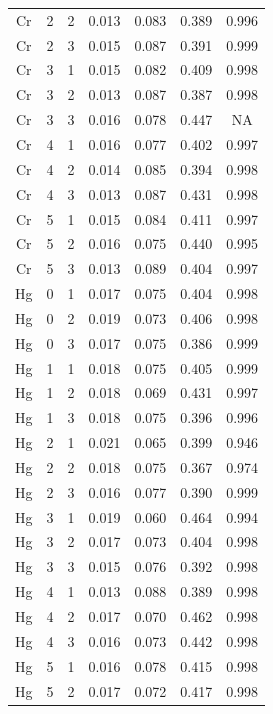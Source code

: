 \documentclass[ms, hidelinks]{uncgdissertationexp}
\theoremstyle{plain}
\theoremstyle{definition}
\theoremstyle{remark}
\begin{document}
\begin{longtable}{ccccccc}
Cr & 2 & 2 & 0.013 & 0.083 & 0.389 & 0.996\\
\rowcolor{gray!6}  Cr & 2 & 3 & 0.015 & 0.087 & 0.391 & 0.999\\
Cr & 3 & 1 & 0.015 & 0.082 & 0.409 & 0.998\\
\rowcolor{gray!6}  Cr & 3 & 2 & 0.013 & 0.087 & 0.387 & 0.998\\
Cr & 3 & 3 & 0.016 & 0.078 & 0.447 & NA\\
\rowcolor{gray!6}  Cr & 4 & 1 & 0.016 & 0.077 & 0.402 & 0.997\\
Cr & 4 & 2 & 0.014 & 0.085 & 0.394 & 0.998\\
\rowcolor{gray!6}  Cr & 4 & 3 & 0.013 & 0.087 & 0.431 & 0.998\\
Cr & 5 & 1 & 0.015 & 0.084 & 0.411 & 0.997\\
\rowcolor{gray!6}  Cr & 5 & 2 & 0.016 & 0.075 & 0.440 & 0.995\\
Cr & 5 & 3 & 0.013 & 0.089 & 0.404 & 0.997\\
\rowcolor{gray!6}  Hg & 0 & 1 & 0.017 & 0.075 & 0.404 & 0.998\\
Hg & 0 & 2 & 0.019 & 0.073 & 0.406 & 0.998\\
\rowcolor{gray!6}  Hg & 0 & 3 & 0.017 & 0.075 & 0.386 & 0.999\\
Hg & 1 & 1 & 0.018 & 0.075 & 0.405 & 0.999\\
\rowcolor{gray!6}  Hg & 1 & 2 & 0.018 & 0.069 & 0.431 & 0.997\\
Hg & 1 & 3 & 0.018 & 0.075 & 0.396 & 0.996\\
\rowcolor{gray!6}  Hg & 2 & 1 & 0.021 & 0.065 & 0.399 & 0.946\\
Hg & 2 & 2 & 0.018 & 0.075 & 0.367 & 0.974\\
\rowcolor{gray!6}  Hg & 2 & 3 & 0.016 & 0.077 & 0.390 & 0.999\\
Hg & 3 & 1 & 0.019 & 0.060 & 0.464 & 0.994\\
\rowcolor{gray!6}  Hg & 3 & 2 & 0.017 & 0.073 & 0.404 & 0.998\\
Hg & 3 & 3 & 0.015 & 0.076 & 0.392 & 0.998\\
\rowcolor{gray!6}  Hg & 4 & 1 & 0.013 & 0.088 & 0.389 & 0.998\\
Hg & 4 & 2 & 0.017 & 0.070 & 0.462 & 0.998\\
\rowcolor{gray!6}  Hg & 4 & 3 & 0.016 & 0.073 & 0.442 & 0.998\\
Hg & 5 & 1 & 0.016 & 0.078 & 0.415 & 0.998\\
\rowcolor{gray!6}  Hg & 5 & 2 & 0.017 & 0.072 & 0.417 & 0.998\\

\end{longtable}
\end{document}

